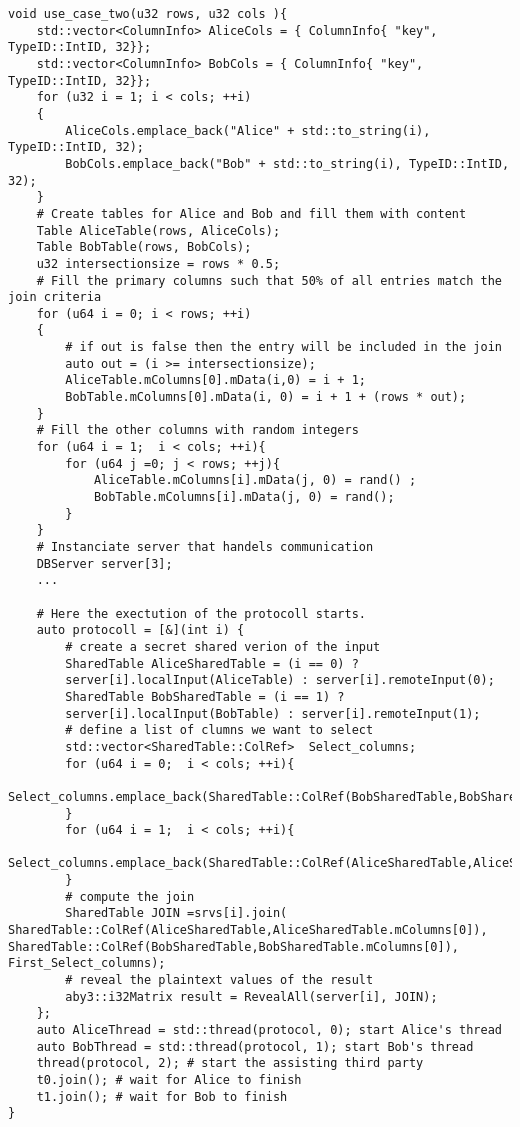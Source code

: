 \begin{lstlisting}[caption={Implementation of use case one using ABY3}]
void use_case_two(u32 rows, u32 cols ){
	std::vector<ColumnInfo> AliceCols = { ColumnInfo{ "key", TypeID::IntID, 32}};
	std::vector<ColumnInfo> BobCols = { ColumnInfo{ "key", TypeID::IntID, 32}};
	for (u32 i = 1; i < cols; ++i)
	{
		AliceCols.emplace_back("Alice" + std::to_string(i), TypeID::IntID, 32);
		BobCols.emplace_back("Bob" + std::to_string(i), TypeID::IntID, 32);
	}
	# Create tables for Alice and Bob and fill them with content
	Table AliceTable(rows, AliceCols);
	Table BobTable(rows, BobCols);
	u32 intersectionsize = rows * 0.5;
	# Fill the primary columns such that 50% of all entries match the join criteria 
	for (u64 i = 0; i < rows; ++i)
	{
		# if out is false then the entry will be included in the join
		auto out = (i >= intersectionsize);
		AliceTable.mColumns[0].mData(i,0) = i + 1;
		BobTable.mColumns[0].mData(i, 0) = i + 1 + (rows * out);
	}
	# Fill the other columns with random integers
	for (u64 i = 1;  i < cols; ++i){
		for (u64 j =0; j < rows; ++j){
			AliceTable.mColumns[i].mData(j, 0) = rand() ;
			BobTable.mColumns[i].mData(j, 0) = rand();	
		}
	}
	# Instanciate server that handels communication
	DBServer server[3]; 
	...

	# Here the exectution of the protocoll starts.
	auto protocoll = [&](int i) {
		# create a secret shared verion of the input
		SharedTable AliceSharedTable = (i == 0) ? 
		server[i].localInput(AliceTable) : server[i].remoteInput(0);
		SharedTable BobSharedTable = (i == 1) ?
		server[i].localInput(BobTable) : server[i].remoteInput(1);
		# define a list of clumns we want to select
		std::vector<SharedTable::ColRef>  Select_columns;		
		for (u64 i = 0;  i < cols; ++i){
			Select_columns.emplace_back(SharedTable::ColRef(BobSharedTable,BobSharedTable.mColumns[i]));
		}
		for (u64 i = 1;  i < cols; ++i){
			Select_columns.emplace_back(SharedTable::ColRef(AliceSharedTable,AliceSharedTable.mColumns[i]));
		}
		# compute the join
		SharedTable JOIN =srvs[i].join( SharedTable::ColRef(AliceSharedTable,AliceSharedTable.mColumns[0]), SharedTable::ColRef(BobSharedTable,BobSharedTable.mColumns[0]), First_Select_columns);
		# reveal the plaintext values of the result
		aby3::i32Matrix result = RevealAll(server[i], JOIN); 
	};
	auto AliceThread = std::thread(protocol, 0); start Alice's thread
	auto BobThread = std::thread(protocol, 1); start Bob's thread
	thread(protocol, 2); # start the assisting third party
	t0.join(); # wait for Alice to finish
	t1.join(); # wait for Bob to finish
}
\end{lstlisting}
